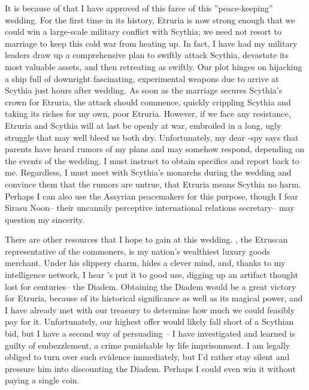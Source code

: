 \documentclass[char]{Kos}
\begin{document}
It is because of \cBride{\them} that I have approved of this farce of this ''peace-keeping'' wedding. For the first time in its history, Etruria is now strong enough that we could win a large-scale military conflict with Scythia; we need not resort to marriage to keep this cold war from heating up. In fact, I have had my military leaders draw up a comprehensive plan to swiftly attack Scythia, devastate its most valuable assets, and then retreating as swiftly. Our plot hinges on hijacking a ship full of downright fascinating, experimental weapons due to arrive at Scythia just hours after wedding. As soon as the marriage secures Scythia's crown \cBride{\prince} for Etruria, the attack should commence, quickly crippling Scythia and taking its riches for my own, poor Etruria. However, if we face any resistance, Etruria and Scythia will at last be openly at war, embroiled in a long, ugly struggle that may well bleed us both dry. Unfortunately, my dear \cBride{\prince}-spy says that \cBride{\their} parents have heard rumors of my plans and may somehow respond, depending on the events of the wedding. I must instruct \cBride{\them} to obtain specifics and report back to me. Regardless, I must meet with Scythia's monarchs during the wedding and convince them that the rumors are untrue, that Etruria means Scythia no harm. Perhaps I can also use the Assyrian peacemakers for this purpose, though I fear Sirasu Noon-- their uncannily perceptive international relations secretary-- may question my sincerity.

There are other resources that I hope to gain at this wedding. \cMerchant{}, the Etruscan representative of the commoners, is my nation's wealthiest luxury goods merchant. Under his slippery charm, \cMerchant{\they} hides a clever mind, and, thanks to my intelligence network, I hear \cMerchant{\they}'s put it to good use, digging up an artifact thought lost for centuries-- the Diadem. Obtaining the Diadem would be a great victory for Etruria, because of its historical significance as well as its magical power, and I have already met with our treasury to determine how much we could feasibly pay for it. Unfortunately, our highest offer would likely fall short of a Scythian bid, but I have a second way of persuading \cMerchant{}-- I have investigated \cMerchant{\them} and learned \cMerchant{\they} is guilty of embezzlement, a crime punishable by life imprisonment. I am legally obliged to turn over such evidence immediately, but I'd rather stay silent and pressure him into discounting the Diadem. Perhaps I could even win it without paying a single coin.
\end{document}
